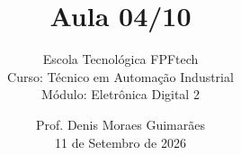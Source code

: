 
\title{Aula 04/10}

\subtitle{\texorpdfstring{%
Escola Tecnológica FPFtech\\[0.3cm]
Curso: Técnico em Automação Industrial\\[0.3cm]
Módulo: Eletrônica Digital 2
}{Escola Tecnológica FPFtech — Curso: Técnico em Automação Industrial — Módulo: Eletrônica Digital 2}}

\author{\texorpdfstring{%
Prof. Denis Moraes Guimarães\\
\small 11 de Setembro de 2026
}{Prof. Denis Moraes Guimarães}}

\date{}
